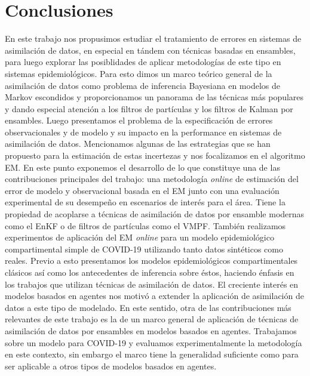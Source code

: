 \chapter{Conclusiones}

En este trabajo nos propusimos estudiar el tratamiento de errores en sistemas de asimilación de datos, en especial en tándem con técnicas basadas en ensambles, para luego explorar las posiblidades de aplicar metodologías de este tipo en sistemas epidemiológicos. Para esto dimos un marco teórico general de la asimilación de datos como problema de inferencia Bayesiana en modelos de Markov escondidos y proporcionamos un panorama de las técnicas más populares y dando especial atención a los filtros de partículas y los filtros de Kalman por ensambles. Luego presentamos el problema de la especificación de errores observacionales y de modelo y su impacto en la performance en sistemas de asimilación de datos. Mencionamos algunas de las estrategias que se han propuesto para la estimación de estas incertezas y nos focalizamos en el algoritmo EM. En este punto exponemos el desarrollo de lo que constituye una de las contribuciones principales del trabajo: una metodología \textit{online} de estimación del error de modelo y observacional basada en el EM junto con una evaluación experimental de su desempeño en escenarios de interés para el área. Tiene la propiedad de acoplarse a técnicas de asimilación de datos por ensamble modernas como el EnKF o de filtros de partículas como el VMPF. También realizamos experimentos de aplicación del EM \textit{online} para un modelo epidemiológico compartimental simple de COVID-19 utilizando tanto datos sintéticos como reales. Previo a esto presentamos los modelos epidemiológicos compartimentales clásicos así como los antecedentes de inferencia sobre éstos, haciendo énfasis en los trabajos que utilizan técnicas de asimilación de datos. El creciente interés en modelos basados en agentes nos motivó a extender la aplicación de asimilación de datos a este tipo de modelado. En este sentido, otra de las contribuciones más relevantes de este trabajo es la de un marco general de aplicación de técnicas de asimilación de datos por ensambles en modelos basados en agentes. Trabajamos sobre un modelo para COVID-19 y evaluamos experimentalmente la metodología en este contexto, sin embargo el marco tiene la generalidad suficiente como para ser aplicable a otros tipos de modelos basados en agentes.

